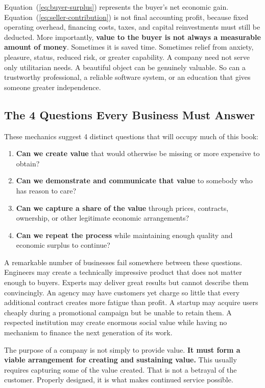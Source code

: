 Equation~(\ref{eq:buyer-surplus}) represents the buyer's net economic gain. Equation~(\ref{eq:seller-contribution}) is not final accounting profit, because fixed operating overhead, financing costs, taxes, and capital reinvestments must still be deducted. More importantly, \textbf{value to the buyer is not always a measurable amount of money}. Sometimes it is saved time. Sometimes relief from anxiety, pleasure, status, reduced risk, or greater capability. A company need not serve only utilitarian needs. A beautiful object can be genuinely valuable. So can a trustworthy professional, a reliable software system, or an education that gives someone greater independence.

\subsection{The 4 Questions Every Business Must Answer}

These mechanics suggest 4 distinct questions that will occupy much of this book:
\begin{enumerate}[label=\textbf{\arabic*.},leftmargin=11pt,itemsep=0.5pt,topsep=1pt,parsep=0pt]
  \item \textbf{Can we create value} that would otherwise be missing or more expensive to obtain?
  \item \textbf{Can we demonstrate and communicate that value} to somebody who has reason to care?
  \item \textbf{Can we capture a share of the value} through prices, contracts, ownership, or other legitimate economic arrangements?
  \item \textbf{Can we repeat the process} while maintaining enough quality and economic surplus to continue?
\end{enumerate}
A remarkable number of businesses fail somewhere between these questions. Engineers may create a technically impressive product that does not matter enough to buyers. Experts may deliver great results but cannot describe them convincingly. An agency may have customers yet charge so little that every additional contract creates more fatigue than profit. A startup may acquire users cheaply during a promotional campaign but be unable to retain them. A respected institution may create enormous social value while having no mechanism to finance the next generation of its work.

The purpose of a company is not simply to provide value. \textbf{It must form a viable arrangement for creating and sustaining value.} This usually requires capturing some of the value created. That is not a betrayal of the customer. Properly designed, it is what makes continued service possible.

